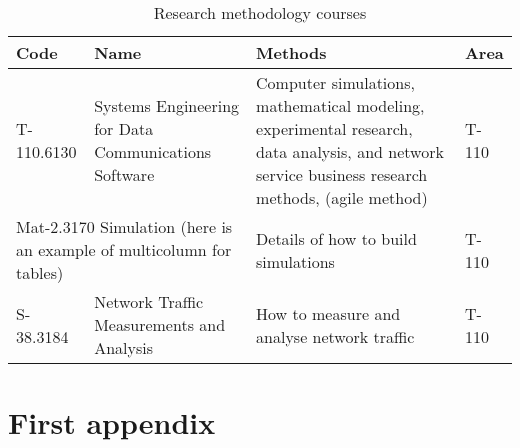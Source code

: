 \documentclass[12pt,a4paper,oneside,pdftex]{report}
\begin{document}
\begin{table}
\begin{tabular}{|p{2cm}|p{3.8cm}|p{4.5cm}|p{1.1cm}|}
\hline %
\textbf{Code} & \textbf{Name} & \textbf{Methods} & \textbf{Area} \\
\hline
T-110.6130 & Systems Engineering for Data Communications
    Software & \raggedright Computer simulations, mathematical modeling,
  experimental research, data analysis, and network service business
  research methods, (agile method) & T-110 \\
\hline
\multicolumn{2}{|p{6.25cm}|}{Mat-2.3170 Simulation (here is an example of
 multicolumn for tables)}& Details of how to build simulations & T-110 \\
\hline
S-38.3184 & Network Traffic Measurements and Analysis
& \raggedright How to measure and analyse network
  traffic & T-110 \\ \hline
\end{tabular} %
\caption{Research methodology courses}
\label{table:courses}
\end{table} %

% 
\clearpage
{}
{}



\appendix
% 

\chapter{First appendix}
\label{chapter:first-appendix}
\end{document}
